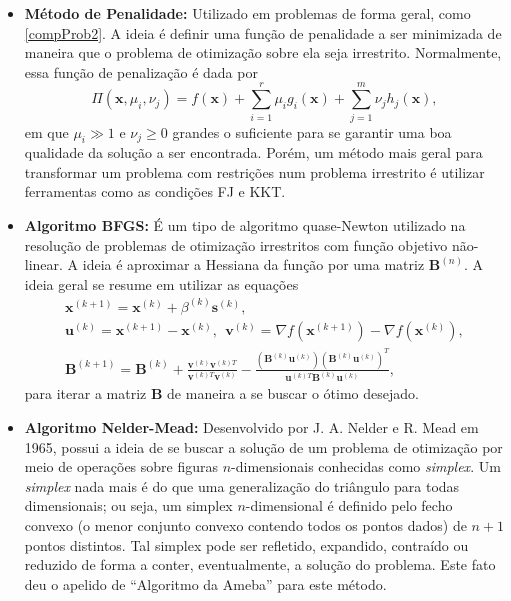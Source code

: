 \begin{itemize}
\item \textbf{M\'{e}todo de Penalidade:} Utilizado em problemas de forma geral, como \eqref{compProb2}. A ideia \'{e} definir uma fun\c{c}\~{a}o de penalidade a ser minimizada de maneira que o problema de otimiza\c{c}\~{a}o sobre ela seja irrestrito. Normalmente, essa fun\c{c}\~{a}o de penaliza\c{c}\~{a}o \'{e} dada por
\begin{equation}
\Pi(\mathbf{x},\mu_i,\nu_j) = f(\mathbf{x}) + \sum_{i=1}^{r} \mu_i g_i(\mathbf{x}) + \sum_{j=1}^{m} \nu_j h_j(\mathbf{x}),
\end{equation} 
em que $\mu_i \gg 1$ e $\nu_j \ge 0$ grandes o suficiente para se garantir uma boa qualidade da solu\c{c}\~{a}o a ser encontrada. Por\'{e}m, um m\'{e}todo mais geral para transformar um problema com restri\c{c}\~{o}es num problema irrestrito \'{e} utilizar ferramentas como as condi\c{c}\~{o}es FJ e KKT.

\item \textbf{Algoritmo BFGS:} \'{E} um tipo de algoritmo quase-Newton utilizado na resolu\c{c}\~{a}o de problemas de otimiza\c{c}\~{a}o irrestritos com fun\c{c}\~{a}o objetivo n\~{a}o-linear. A ideia \'{e} aproximar a Hessiana da fun\c{c}\~{a}o por uma matriz $\mathbf{B}^{(n)}$. A ideia geral se resume em utilizar as equa\c{c}\~{o}es
\begin{equation*}
\begin{array}{c}
\mathbf{x}^{(k+1)} = \mathbf{x}^{(k)} + \beta^{(k)} \mathbf{s}^{(k)},\\
\mathbf{u}^{(k)} = \mathbf{x}^{(k+1)} - \mathbf{x}^{(k)},~~\mathbf{v}^{(k)} = \nabla f(\mathbf{x}^{(k+1)}) - \nabla f(\mathbf{x}^{(k)}),\\
\mathbf{B}^{(k+1)} = \mathbf{B}^{(k)} + \frac{\mathbf{v}^{(k)}\mathbf{v}^{(k)T}}{\mathbf{v}^{(k)T}\mathbf{v}^{(k)}} - \frac{\left(\mathbf{B}^{(k)}\mathbf{u}^{(k)}\right)\left(\mathbf{B}^{(k)}\mathbf{u}^{(k)}\right)^{T}}{\mathbf{u}^{(k)T}\mathbf{B}^{(k)}\mathbf{u}^{(k)}},
\end{array}
\end{equation*}
para iterar a matriz $\mathbf{B}$ de maneira a se buscar o \'{o}timo desejado.

\item \textbf{Algoritmo Nelder-Mead:} Desenvolvido por J. A. Nelder e R. Mead em 1965, possui a ideia de se buscar a solu\c{c}\~{a}o de um problema de otimiza\c{c}\~{a}o por meio de opera\c{c}\~{o}es sobre figuras $n$-dimensionais conhecidas como \textit{simplex}. Um \textit{simplex} nada mais \'{e} do que uma generaliza\c{c}\~{a}o do tri\^{a}ngulo para todas dimensionais; ou seja, um simplex $n$-dimensional \'{e} definido pelo fecho convexo (o menor conjunto convexo contendo todos os pontos dados) de $n+1$ pontos distintos. Tal simplex pode ser refletido, expandido, contra\'{i}do ou reduzido de forma a conter, eventualmente, a solu\c{c}\~{a}o do problema. Este fato deu o apelido de ``Algoritmo da Ameba'' para este m\'{e}todo.


\end{itemize}
